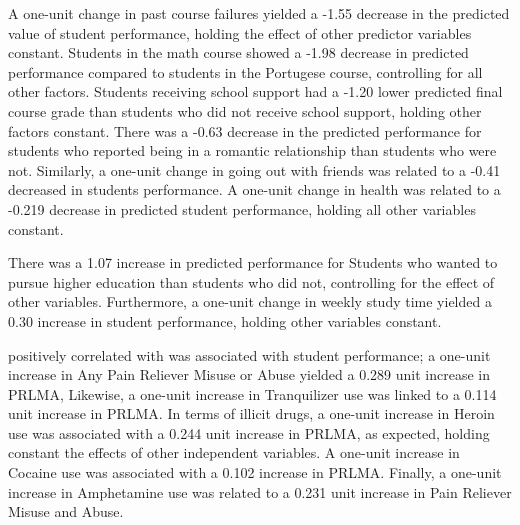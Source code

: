 \documentclass[sigconf]{acmart}
\begin{document}
A one-unit change in past course failures yielded a -1.55 decrease in the 
predicted value of student performance, holding the effect of other predictor
variables constant. Students in the math course showed a -1.98 decrease in 
predicted performance compared to students in the Portugese course, 
controlling for all other factors. Students receiving school support had a 
-1.20 lower predicted final course grade than students who did not receive
school support, holding other factors constant. There was a -0.63 decrease
in the predicted performance for students who reported being in a romantic
relationship than students who were not. Similarly, a one-unit change in 
going out with friends was related to a -0.41 decreased in students performance. 
A one-unit change in health was related to a -0.219 decrease in predicted
student performance, holding all other variables constant. 

There was a 1.07 increase in predicted performance for Students who wanted to 
pursue higher education than students who did not, controlling for the effect 
of other variables. Furthermore, a one-unit change in weekly study time 
yielded a 0.30 increase in student performance, holding other variables 
constant. 




positively correlated with  was 
associated with
student performance; a  one-unit increase in Any 
Pain Reliever Misuse or Abuse yielded a 0.289 unit increase in PRLMA, Likewise, a one-unit increase in Tranquilizer use was 
linked to a 0.114 unit increase in PRLMA. In terms of illicit drugs, a one-unit 
increase in Heroin use was associated with a 0.244 unit increase in PRLMA, as 
expected, holding constant the effects of other independent variables. 
A one-unit increase in Cocaine use was associated with a 0.102 increase in PRLMA. 
Finally, a one-unit increase in Amphetamine use was related to a 0.231 unit 
increase in Pain Reliever Misuse and Abuse.  
\end{document}
